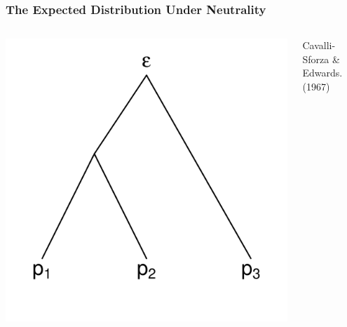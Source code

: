 \documentclass{beamer}
\begin{document}
\begin{frame}
	\frametitle	{The Expected Distribution Under Neutrality}
	\begin{columns}

		\begin{column}{0.56\textwidth}
                  \includegraphics[height = \textheight]{../figs/ThreeBranch.pdf}
		\end{column}

		\begin{column}{0.45\textwidth}


{\tiny Cavalli-Sforza \& Edwards. (1967) }
		\end{column}
	\end{columns}
\end{frame}
\end{document}
